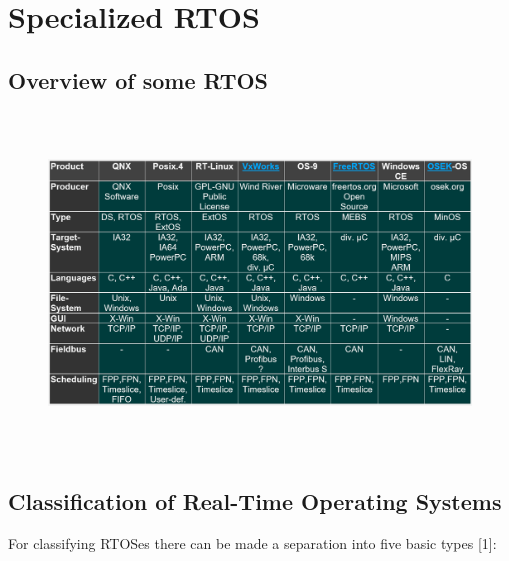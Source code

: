 \section{Specialized RTOS}

\subsection{ Overview of some RTOS}

 	\begin{figure}[h]
    \centering
    \includegraphics[width=15cm, height=9cm]{Images/image127.png}
    \label{fig:Fig 78}
    \end{figure}

\subsection{ Classification of Real-Time Operating Systems}

For classifying RTOSes there can be made a separation into five basic types [1]:

